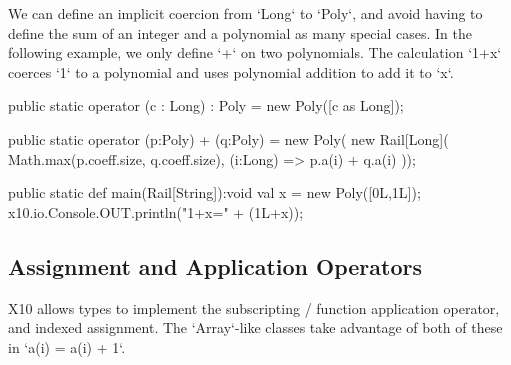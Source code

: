 \begin{ex}
We can define an implicit coercion from \xcd`Long` to \xcd`Poly`,
and avoid having to define the sum of an integer and a polynomial
as many special cases.  In the following example, we only define \xcd`+` on
two polynomials.  The
calculation \xcd`1+x` coerces \xcd`1` to a polynomial and uses polynomial
addition to add it to \xcd`x`.


\begin{xten}
  public static operator (c : Long) : Poly 
     = new Poly([c as Long]);

  public static operator (p:Poly) + (q:Poly) = new Poly(
      new Rail[Long](
        Math.max(p.coeff.size, q.coeff.size),
        (i:Long) => p.a(i) + q.a(i)
     ));

  public static def main(Rail[String]):void {
     val x = new Poly([0L,1L]);
     x10.io.Console.OUT.println("1+x=" + (1L+x));
  }
\end{xten}
\end{ex}



\subsection{Assignment and Application Operators}
\index{()}
\index{()=}
\label{set-and-apply}
X10 allows types to implement the subscripting / function application
operator, and indexed assignment.  The \xcd`Array`-like classes take advantage
of both of these in \xcd`a(i) = a(i) + 1`.  

